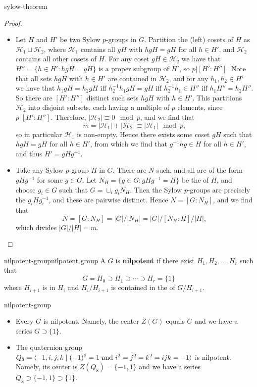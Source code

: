 \begin{example}{sylow-theorem}
\begin{proof}
\begin{itemize}
        \item Let $H$ and $H'$ be two Sylow $p$-groups in $G$. Partition the (left) cosets of $H$ as $\mathcal{H}_1 \sqcup \mathcal{H}_2$, where $\mathcal{H}_1$ contains all $gH$ with $hgH = gH$ for all $h \in H'$, and $\mathcal{H}_2$ contains all other cosets of $H$. For any coset $gH \in \mathcal{H}_2$ we have that $H'' = \{ h \in H' : hgH = gH \}$ is a proper subgroup of $H'$, so $p | [H' : H'']$. Note that all sets $hgH$ with $h \in H'$ are contained in $\mathcal{H}_2$, and for any $h_1, h_2 \in H'$ we have that $h_1 g H = h_2 g H$ iff $h_2^{-1} h_1 g H = g H$ iff $h_2^{-1} h_1 \in H''$ iff $h_1 H'' = h_2 H''$. So there are $[H' : H'']$ distinct such sets $hgH$ with $h \in H'$. This partitions $\mathcal{H}_2$ into disjoint subsets, each having a multiple of $p$ elements, since $p | [H' : H'']$. Therefore, $|\mathcal{H}_2| \equiv 0 \mod p$, and we find that
        \[ m = |\mathcal{H}_1| + |\mathcal{H}_2| \equiv |\mathcal{H}_1| \mod p , \]
        so in particular $\mathcal{H}_1$ is non-empty. Hence there exists some coset $gH$ such that $hgH = gH$ for all $h \in H'$, from which we find that $g^{-1}hg \in H$ for all $h \in H'$, and thus $H' = gHg^{-1}$.
        
        \item Take any Sylow $p$-group $H$ in $G$. There are $N$ such, and all are of the form $gHg^{-1}$ for some $g \in G$. Let $N_H = \{ g \in G : gHg^{-1} = H \}$ be the  of $H$, and choose $g_i \in G$ such that $G = \sqcup_i g_i N_H$. Then the Sylow $p$-groups are precisely the $g_i H g_i^{-1}$, and these are pairwise distinct. Hence $N = [G : N_H]$, and we find that
        \[ N = [G : N_H] = |G| / |N_H| = |G| / [N_H : H] / |H| , \]
        which divides $|G| / |H| = m$.
    \end{itemize}
    \end{proof}
\end{example}

\begin{topic}{nilpotent-group}{nilpotent group}
    A  $G$ is \textbf{nilpotent} if there exist  $H_1, H_2, \ldots, H_r$ such that
    \[ G = H_0 \supset H_1 \supset \cdots \supset H_r = \{ 1 \} \]
    where $H_{i + 1}$ is  in $H_i$ and $H_i/H_{i + 1}$ is contained in the  of $G/H_{i + 1}$.
\end{topic}

\begin{example}{nilpotent-group}
    \begin{itemize}
        \item Every  $G$ is nilpotent. Namely, the center $Z(G)$ equals $G$ and we have a series $G \supset \{ 1 \}$.
        \item The quaternion group $Q_8 = \langle -1, i, j, k \;|\; (-1)^2 = 1 \textup{ and } i^2 = j^2 = k^2 = ijk = -1 \rangle$ is nilpotent. Namely, its center is $Z(Q_8) = \{ -1, 1 \}$ and we have a series $Q_8 \supset \{ -1, 1 \} \supset \{ 1 \}$.
    \end{itemize}
\end{example}

